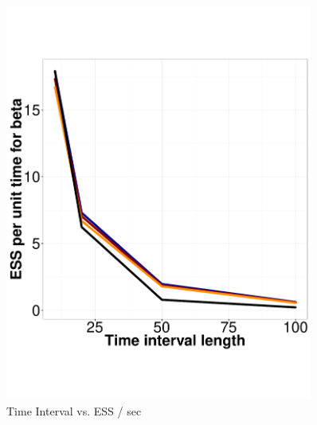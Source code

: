 \begin{figure}
\begin{minipage}[hp]{0.45\linewidth}
    \includegraphics [width=0.90\textwidth, angle=0]{figs/ESS_vs_t_beta.pdf}
    \vspace{-0 in}
  \end{minipage}
    \caption{Time Interval vs. ESS / sec}
     \label{fig:TSS}
  \end{figure}
